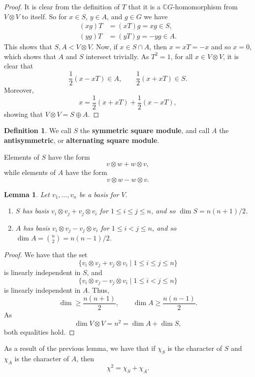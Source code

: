 \documentclass[11pt, notitlepage]{article}
\numberwithin{equation}{section}
\theoremstyle{plain}
\newtheorem{lemma}[theorem]{Lemma}
\theoremstyle{definition}
\newtheorem{definition}[theorem]{Definition}
\newcommand{\CG}{{\mathbb{C}G}}
\begin{document}
\begin{proof}
It is clear from the definition of $T$ that it is a $\CG$-homomorphism from $V \otimes V$ to itself. So for $x \in S$, $y \in A$, and $g \in G$ we have
\begin{align*}
    (xg)T &= (xT)g = xg \in S,\\
    (yg)T &= (yT)g = -yg \in A.
\end{align*}
This shows that $S,A < V \otimes V$. Now, if $x \in S \cap A$, then $x = xT = -x$ and so $x = 0$, which shows that $A$ and $S$ intersect trivially. As $T^2 = 1$, for all $x \in V \otimes V$, it is clear that
\[
    \frac{1}{2}(x - xT) \in A, \qquad \frac{1}{2}(x+xT) \in S.
\]
Moreover,
\[
    x = \frac{1}{2}(x+xT) + \frac{1}{2}(x - xT),
\]
showing that $V \otimes V = S \oplus A$.
\end{proof}

\begin{definition}
We call $S$ the \textbf{symmetric square module}, and call $A$ the \textbf{antisymmetric}, or \textbf{alternating square module}.
\end{definition}

Elements of $S$ have the form
\[
    v \otimes w + w \otimes v,
\]
while elements of $A$ have the form
\[
    v \otimes w - w \otimes v.
\]

\begin{lemma}
Let $v_1,\dots,v_n$ be a basis for $V$.
\begin{enumerate}[label=\emph{(\Roman*)}]
    \item $S$ has basis $v_i \otimes v_j + v_j \otimes v_i$ for $1 \le i \le j \le n$, and so $\dim S = n(n+1)/2$.
    \item $A$ has basis $v_i \otimes v_j - v_j \otimes v_i$ for $1 \le i < j \le n$, and so $\dim A = \binom{n}{2} = n(n-1)/2$.
\end{enumerate}
\end{lemma}

\begin{proof}
We have that the set
\[
    \{v_i \otimes v_j + v_j \otimes v_i \mid 1 \le i \le j \le n\}
\]
is linearly independent in $S$, and
\[
    \{v_i \otimes v_j - v_j \otimes v_i \mid 1 \le i < j \le n\}
\]
is linearly independent in $A$. Thus,
\[
    \dim \ge \frac{n(n+1)}{2}, \qquad \dim A \ge \frac{n(n-1)}{2}.
\]
As
\[
    \dim V \otimes V = n^2 = \dim A + \dim S,
\]
both equalities hold.
\end{proof}

As a result of the previous lemma, we have that if $\chi_S$ is the character of $S$ and $\chi_A$ is the character of $A$, then
\[
    \chi^2 = \chi_S + \chi_A.
\]
\end{document}
